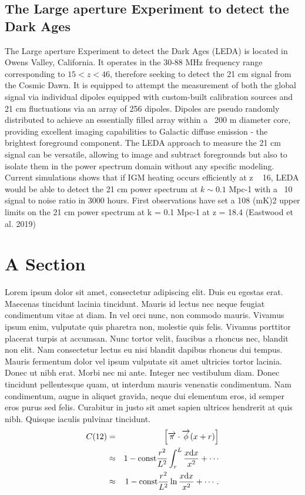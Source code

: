 \subsection{The Large aperture Experiment to detect the Dark Ages}
The Large aperture Experiment to detect the Dark Ages (LEDA) is located in Owens Valley, California. It operates in the 30-88 MHz frequency range corresponding to $15 < z < 46$, therefore seeking to detect the 21 cm signal from the Cosmic Dawn. It is equipped to attempt the measurement of both the global signal via individual dipoles equipped with custom-built calibration sources and 21 cm fluctuations via an array of 256 dipoles. Dipoles are pseudo randomly distributed to achieve an essentially filled array within a ~200 m diameter core, providing excellent imaging capabilities to Galactic diffuse emission - the brightest foreground component. The LEDA approach to measure the 21 cm signal can be versatile, allowing to image and subtract foregrounds but also to isolate them in the power spectrum domain without any specific modeling. Current simulations shows that if IGM heating occurs efficiently at z ~ 16, LEDA would be able to detect the 21 cm power spectrum at $k \sim 0.1$ Mpc-1 with a ~10 signal to noise ratio in 3000 hours. First observations have set a 108 (mK)2 upper limits on the 21 cm power spectrum at k = 0.1 Mpc-1 at z = 18.4 (Eastwood et al. 2019)



\section{A Section}

Lorem ipsum dolor sit amet, consectetur adipiscing elit. Duis eu egestas erat. Maecenas tincidunt lacinia tincidunt. Mauris id lectus nec neque feugiat condimentum vitae at diam. In vel orci nunc, non commodo mauris. Vivamus ipsum enim, vulputate quis pharetra non, molestie quis felis. Vivamus porttitor placerat turpis at accumsan. Nunc tortor velit, faucibus a rhoncus nec, blandit non elit. Nam consectetur lectus eu nisi blandit dapibus rhoncus dui tempus. Mauris fermentum dolor vel ipsum vulputate sit amet ultricies tortor lacinia. Donec ut nibh erat. Morbi nec mi ante. Integer nec vestibulum diam. Donec tincidunt pellentesque quam, ut interdum mauris venenatis condimentum. Nam condimentum, augue in aliquet gravida, neque dui elementum eros, id semper eros purus sed felis. Curabitur in justo sit amet sapien ultrices hendrerit at quis nibh. Quisque iaculis pulvinar tincidunt. 
\begin{eqnarray}
C(12) &= &\left[\overrightarrow{\pi}\cdot\overrightarrow{\phi}(x+r)\right] \nonumber \\ 
&\approx& 1-\mathrm{const}\frac{r^2}{L^2}\int_r^L\frac{x\mathrm{d} x}{x^2} + \cdots \nonumber  \\
&\approx& 1-\mathrm{const}\frac{r^2}{L^2}\ln\frac{x\mathrm{d} x}{x^2} + \cdots .\label{brokenlongeqn}
\end{eqnarray}

